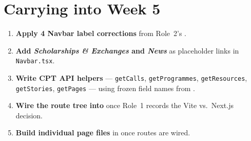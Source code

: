 \documentclass[12pt,a4paper]{article}
\begin{document}
\section{Carrying into Week 5}

\begin{enumerate}
    \item \textbf{Apply 4 Navbar label corrections} from Role~2's
          .
    \item \textbf{Add \textit{Scholarships \& Exchanges} and \textit{News}}
          as placeholder links in \texttt{Navbar.tsx}.
    \item \textbf{Write CPT API helpers} ---
          \texttt{getCalls}, \texttt{getProgrammes}, \texttt{getResources},
          \texttt{getStories}, \texttt{getPages} --- using frozen field names
          from .
    \item \textbf{Wire the route tree into } once Role~1
          records the Vite vs.\ Next.js decision.
    \item \textbf{Build individual page files} in  once
          routes are wired.
\end{enumerate}
\end{document}
